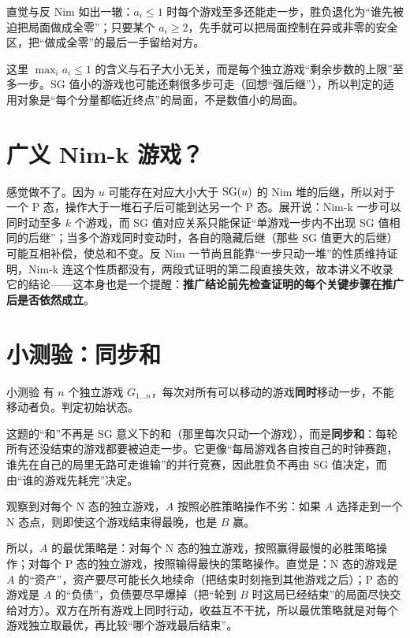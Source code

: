 直觉与反 Nim 如出一辙：$a_i\le1$ 时每个游戏至多还能走一步，胜负退化为“谁先被迫把局面做成全零”；只要某个 $a_i\ge2$，先手就可以把局面控制在异或非零的安全区，把“做成全零”的最后一手留给对方。

\begin{pitfall}
这里 $\max_i a_i\le1$ 的含义与石子大小无关，而是每个独立游戏“剩余步数的上限”至多一步。SG 值小的游戏也可能还剩很多步可走（回想“强后继”），所以判定的适用对象是“每个分量都临近终点”的局面，不是数值小的局面。
\end{pitfall}

\section{广义 Nim-k 游戏？}
感觉做不了。因为 $u$ 可能存在对应大小大于 $\operatorname{SG}(u)$ 的 Nim 堆的后继，所以对于一个 P 态，操作大于一堆石子后可能到达另一个 P 态。展开说：Nim-k 一步可以同时动至多 $k$ 个游戏，而 SG 值对应关系只能保证“单游戏一步内不出现 SG 值相同的后继”；当多个游戏同时变动时，各自的隐藏后继（那些 SG 值更大的后继）可能互相补偿，使总和不变。反 Nim 一节尚且能靠“一步只动一堆”的性质维持证明，Nim-k 连这个性质都没有，两段式证明的第二段直接失效，故本讲义不收录它的结论——这本身也是一个提醒：\textbf{推广结论前先检查证明的每个关键步骤在推广后是否依然成立}。

\section{小测验：同步和}
\begin{problem}{小测验}
有 $n$ 个独立游戏 $G_{1\ldots n}$，每次对所有可以移动的游戏\textbf{同时}移动一步，不能移动者负。判定初始状态。
\end{problem}

\hint 这题的“和”不再是 SG 意义下的和（那里每次只动一个游戏），而是\textbf{同步和}：每轮所有还没结束的游戏都要被迫走一步。它更像“每局游戏各自按自己的时钟赛跑，谁先在自己的局里无路可走谁输”的并行竞赛，因此胜负不再由 SG 值决定，而由“谁的游戏先耗完”决定。

\sol 观察到对每个 N 态的独立游戏，$A$ 按照必胜策略操作不劣：如果 $A$ 选择走到一个 N 态点，则即使这个游戏结束得最晚，也是 $B$ 赢。

所以，$A$ 的最优策略是：对每个 N 态的独立游戏，按照赢得最慢的必胜策略操作；对每个 P 态的独立游戏，按照输得最快的策略操作。直觉是：N 态的游戏是 $A$ 的“资产”，资产要尽可能长久地续命（把结束时刻拖到其他游戏之后）；P 态的游戏是 $A$ 的“负债”，负债要尽早爆掉（把“轮到 $B$ 时这局已经结束”的局面尽快交给对方）。双方在所有游戏上同时行动，收益互不干扰，所以最优策略就是对每个游戏独立取最优，再比较“哪个游戏最后结束”。

